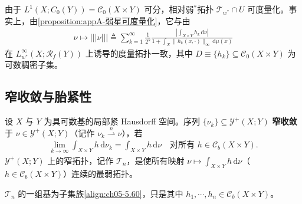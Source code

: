 \documentclass[../../main.tex]{subfiles}%
\begin{document}
\begin{remark}\label{remark:ch05-Young弱星度量}
由于 $L^1(X;C_0(Y))=\mathcal{C}_0(X\times Y)$ 可分，相对弱$^*$拓扑 $\mathcal{T}_{w^*}\cap U$ 可度量化。事实上，由\cref{proposition:appA-弱星可度量化}，它与由
\begin{align}
\nu\mapsto|||\nu|||
\triangleq \sum_{k=1}^\infty\frac{1}{2^k}
\frac{\left|\int_{X\times Y}h_k\,\mathrm{d}\nu\right|}
{1+\int_X\|h_k(x,\cdot)\|_\infty\,\mathrm{d}\mu(x)}\label{align:ch05-5.61}
\end{align}
在 $L^\infty_{w^*}(X;\mathscr{R}_f(Y))$ 上诱导的度量拓扑一致，其中 $D\equiv\{h_k\}\subseteq\mathcal{C}_0(X\times Y)$ 为可数稠密子集。
\end{remark}

\subsection{窄收敛与胎紧性}\label{subsection:ch05-Young窄}

\begin{definition}[窄收敛]\label{definition:ch05-Young窄}
设 $X$ 与 $Y$ 为具可数基的局部紧 Hausdorff 空间。序列 $\{\nu_k\}\subseteq\mathcal{Y}^+(X;Y)$ \textbf{窄收敛}于 $\nu\in\mathcal{Y}^+(X;Y)$（记作 $\nu_k\stackrel{n}{\rightharpoonup}\nu$），若
\begin{align*}
\lim_{k\to\infty}\int_{X\times Y}h\,\mathrm{d}\nu_k
=\int_{X\times Y}h\,\mathrm{d}\nu
\quad\text{对所有 }h\in\mathcal{C}_b(X\times Y).
\end{align*}
$\mathcal{Y}^+(X;Y)$ 上的窄拓扑，记作 $\mathcal{T}_n$，是使所有映射 $\nu\mapsto\int_{X\times Y}h\,\mathrm{d}\nu$（$h\in\mathcal{C}_b(X\times Y)$）连续的最弱拓扑。

$\mathcal{T}_n$ 的一组基为子集族\eqref{align:ch05-5.60}，只是其中 $h_1,\cdots ,h_n\in\mathcal{C}_b(X\times Y)$。
\end{definition}
\end{document}
